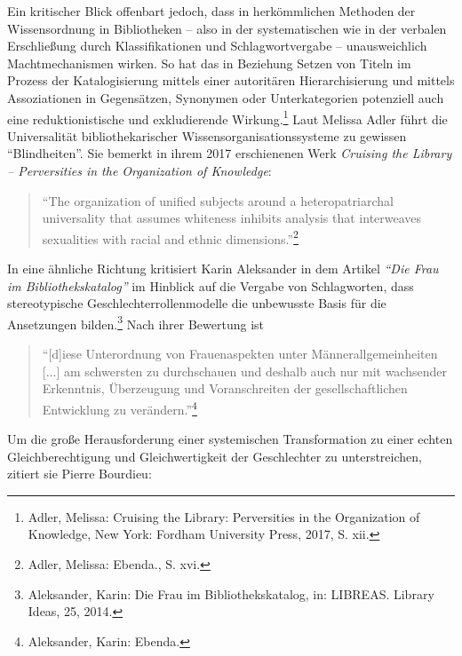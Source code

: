 \documentclass[a4paper,
fontsize=11pt,
oneside,
numbers=noperiodatend,
parskip=half-,
bibliography=totoc,
final
]{scrartcl}
\begin{document}
Ein kritischer Blick offenbart jedoch, dass in herkömmlichen Methoden
der Wissensordnung in Bibliotheken -- also in der systematischen wie in
der verbalen Erschließung durch Klassifikationen und Schlagwortvergabe
-- unausweichlich Machtmechanismen wirken. So hat das in Beziehung
Setzen von Titeln im Prozess der Katalogisierung mittels einer
autoritären Hierarchisierung und mittels Assoziationen in Gegensätzen,
Synonymen oder Unterkategorien potenziell auch eine reduktionistische
und exkludierende Wirkung.\footnote{Adler, Melissa: Cruising the
  Library: Perversities in the Organization of Knowledge, New York:
  Fordham University Press, 2017, S. xii.} Laut Melissa Adler führt die
Universalität bibliothekarischer Wissensorganisationssysteme zu gewissen
\enquote{Blindheiten}. Sie bemerkt in ihrem 2017 erschienenen Werk
\emph{Cruising the Library -- Perversities in the Organization of
Knowledge}:

\begin{quote}
\enquote{The organization of unified subjects around a heteropatriarchal
universality that assumes whiteness inhibits analysis that interweaves
sexualities with racial and ethnic dimensions.}\footnote{Adler, Melissa:
  Ebenda., S. xvi.}
\end{quote}

In eine ähnliche Richtung kritisiert Karin Aleksander in dem Artikel
\emph{\enquote{Die Frau im Bibliothekskatalog}} im Hinblick auf die
Vergabe von Schlagworten, dass stereotypische Geschlechterrollenmodelle
die unbewusste Basis für die Ansetzungen bilden.\footnote{Aleksander,
  Karin: Die Frau im Bibliothekskatalog, in: LIBREAS. Library Ideas, 25,
  2014.} Nach ihrer Bewertung ist

\begin{quote}
\enquote{{[}d{]}iese Unterordnung von Frauenaspekten unter
Männerallgemeinheiten {[}...{]} am schwersten zu durchschauen und
deshalb auch nur mit wachsender Erkenntnis, Überzeugung und
Voranschreiten der gesellschaftlichen Entwicklung zu
verändern.}\footnote{Aleksander, Karin: Ebenda.}
\end{quote}

Um die große Herausforderung einer systemischen Transformation zu einer
echten Gleichberechtigung und Gleichwertigkeit der Geschlechter zu
unterstreichen, zitiert sie Pierre Bourdieu:
\end{document}
